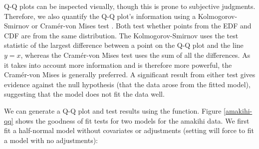 \documentclass[article]{jss}
\begin{document}
Q-Q plots can be inspected visually, though this is prone to subjective
judgments. Therefore, we also quantify the Q-Q plot's information using
a Kolmogorov-Smirnov or Cramér-von Mises test \citep{Burnham:2004vd}.
Both test whether points from the EDF and CDF are from the same
distribution. The Kolmogorov-Smirnov uses the test statistic of the
largest difference between a point on the Q-Q plot and the line \(y=x\),
whereas the Cramér-von Mises test uses the sum of all the differences.
As it takes into account more information and is therefore more
powerful, the Cramér-von Mises is generally preferred. A significant
result from either test gives evidence against the null hypothesis (that
the data arose from the fitted model), suggesting that the model does
not fit the data well.

We can generate a Q-Q plot and test results using the 
function. Figure \ref{amakihi-qq} shows the goodness of fit tests for
two models for the amakihi data. We first fit a half-normal model
without covariates or adjustments (setting  will
force  to fit a model with no adjustments):
\end{document}
